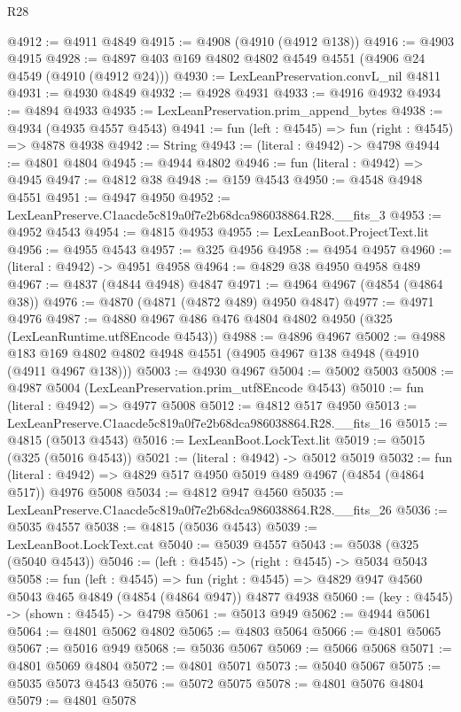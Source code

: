 \begin{lexlean}{R28}
\begin{coremodule}
@4912 := @4911 @4849
@4915 := @4908 (@4910 (@4912 @138))
@4916 := @4903 @4915
@4928 := @4897 @403 @169 @4802 @4802 @4549 @4551 (@4906 @24 @4549 (@4910 (@4912 @24)))
@4930 := LexLeanPreservation.convL_nil @4811
@4931 := @4930 @4849
@4932 := @4928 @4931
@4933 := @4916 @4932
@4934 := @4894 @4933
@4935 := LexLeanPreservation.prim_append_bytes
@4938 := @4934 (@4935 @4557 @4543)
@4941 := fun (left : @4545) => fun (right : @4545) => @4878 @4938
@4942 := String
@4943 := (literal : @4942) -> @4798
@4944 := @4801 @4804
@4945 := @4944 @4802
@4946 := fun (literal : @4942) => @4945
@4947 := @4812 @38
@4948 := @159 @4543
@4950 := @4548 @4948 @4551
@4951 := @4947 @4950
@4952 := LexLeanPreserve.C1aacde5c819a0f7e2b68dca986038864.R28.__fits_3
@4953 := @4952 @4543
@4954 := @4815 @4953
@4955 := LexLeanBoot.ProjectText.lit
@4956 := @4955 @4543
@4957 := @325 @4956
@4958 := @4954 @4957
@4960 := (literal : @4942) -> @4951 @4958
@4964 := @4829 @38 @4950 @4958 @489
@4967 := @4837 (@4844 @4948) @4847
@4971 := @4964 @4967 (@4854 (@4864 @38))
@4976 := @4870 (@4871 (@4872 @489) @4950 @4847)
@4977 := @4971 @4976
@4987 := @4880 @4967 @486 @476 @4804 @4802 @4950 (@325 (LexLeanRuntime.utf8Encode @4543))
@4988 := @4896 @4967
@5002 := @4988 @183 @169 @4802 @4802 @4948 @4551 (@4905 @4967 @138 @4948 (@4910 (@4911 @4967 @138)))
@5003 := @4930 @4967
@5004 := @5002 @5003
@5008 := @4987 @5004 (LexLeanPreservation.prim_utf8Encode @4543)
@5010 := fun (literal : @4942) => @4977 @5008
@5012 := @4812 @517 @4950
@5013 := LexLeanPreserve.C1aacde5c819a0f7e2b68dca986038864.R28.__fits_16
@5015 := @4815 (@5013 @4543)
@5016 := LexLeanBoot.LockText.lit
@5019 := @5015 (@325 (@5016 @4543))
@5021 := (literal : @4942) -> @5012 @5019
@5032 := fun (literal : @4942) => @4829 @517 @4950 @5019 @489 @4967 (@4854 (@4864 @517)) @4976 @5008
@5034 := @4812 @947 @4560
@5035 := LexLeanPreserve.C1aacde5c819a0f7e2b68dca986038864.R28.__fits_26
@5036 := @5035 @4557
@5038 := @4815 (@5036 @4543)
@5039 := LexLeanBoot.LockText.cat
@5040 := @5039 @4557
@5043 := @5038 (@325 (@5040 @4543))
@5046 := (left : @4545) -> (right : @4545) -> @5034 @5043
@5058 := fun (left : @4545) =>
  fun (right : @4545) => @4829 @947 @4560 @5043 @465 @4849 (@4854 (@4864 @947)) @4877 @4938
@5060 := (key : @4545) -> (shown : @4545) -> @4798
@5061 := @5013 @949
@5062 := @4944 @5061
@5064 := @4801 @5062 @4802
@5065 := @4803 @5064
@5066 := @4801 @5065
@5067 := @5016 @949
@5068 := @5036 @5067
@5069 := @5066 @5068
@5071 := @4801 @5069 @4804
@5072 := @4801 @5071
@5073 := @5040 @5067
@5075 := @5035 @5073 @4543
@5076 := @5072 @5075
@5078 := @4801 @5076 @4804
@5079 := @4801 @5078

\end{coremodule}
\end{lexlean}
